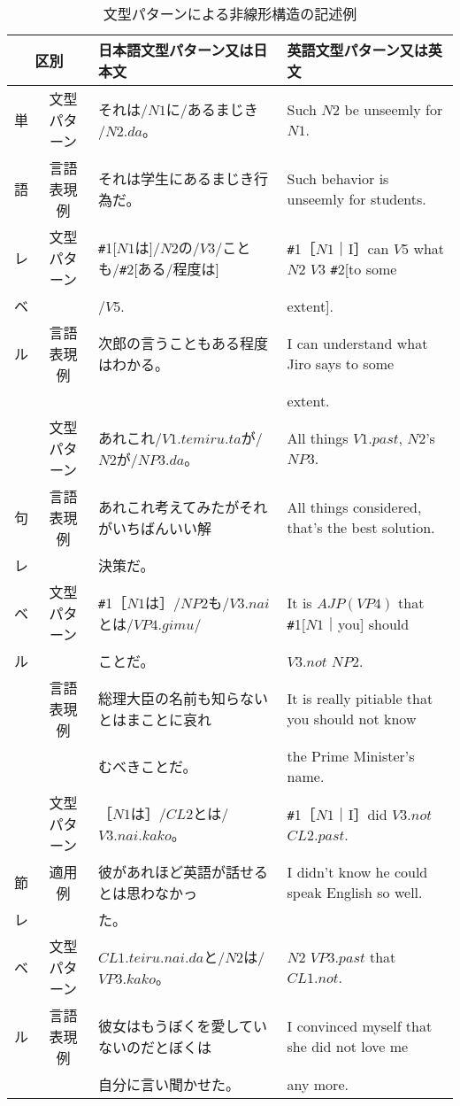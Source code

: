 \documentclass{nlp}
\begin{document}
\begin{table}[!htbp]
\footnotesize
\begin{center}
\caption{文型パターンによる非線形構造の記述例}
\begin{tabular}{|c|c|l|l|}
\hline
\multicolumn{2}{|c|}{区別 } & 日本語文型パターン又は日本文 & 英語文型パターン又は英文 \\ \hline
単 & 文型パターン & それは/$N1$に/あるまじき$/N2.da$。& Such $N2$ be unseemly for $N1$. \\ \cline{2-4}
語 & 言語表現例 & それは学生にあるまじき行為だ。 & Such behavior is unseemly for students. \\ \cline{2-4}
レ & 文型パターン & \verb|#|1[$N1$は]/$N2$の/$V3$/ことも/\verb|#|2[ある/程度は] & \verb|#|1［$N1$｜I］can $V5$ what $N2$ $V3$ \verb|#|2[to some \\ 
ベ & & /$V5$. & extent].  \\ \cline{2-4}
ル & 言語表現例 & 次郎の言うこともある程度はわかる。 & I can understand what Jiro says to some \\ 
 & & & extent. \\ \hline
 & 文型パターン & あれこれ/$V1.temiru.ta$が/$N2$が/$NP3.da$。 & All things $V1.past$, $N2$'s $NP3$. \\ \cline{2-4}
句 & 言語表現例 & あれこれ考えてみたがそれがいちばんいい解 & All things considered, that's the best solution. \\ 
レ & & 決策だ。& \\ \cline{2-4}
ベ & 文型パターン & \verb|#|1［$N1$は］/$NP2$も/$V3.nai$とは/$VP4.gimu$/ & It is $AJP(VP4)$ that \verb|#|1[$N1$｜you] should \\
ル & & ことだ。& $V3.not$ $NP2$. \\ \cline{2-4}
 & 言語表現例 & 総理大臣の名前も知らないとはまことに哀れ & It is really pitiable that you should not know \\
 & & むべきことだ。& the Prime Minister's name. \\ \hline
 & 文型パターン & ［$N1$は］/$CL2$とは/$V3.nai.kako$。 & \verb|#|1［$N1$｜I］did $V3.not$ $CL2.past$. \\ \cline{2-4}
節 & 適用例  & 彼があれほど英語が話せるとは思わなかっ & I didn't know he could speak English so well. \\
レ & & た。& \\ \cline{2-4}
ベ & 文型パターン & $CL1.teiru.nai.da$と/$N2$は/$VP3.kako$。& $N2$ $VP3.past$ that $CL1.not$. \\ \cline{2-4}
ル & 言語表現例 & 彼女はもうぼくを愛していないのだとぼくは & I convinced myself that she did not love me \\
 & & 自分に言い聞かせた。 & any more. \\ \hline
\end{tabular}
\end{center}
\end{table}
\end{document}
